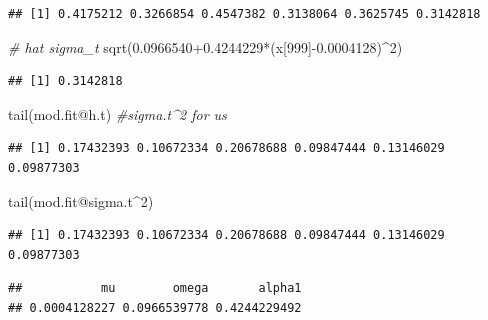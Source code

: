 \documentclass[
]{book}
\newenvironment{Shaded}{\begin{snugshade}}{\end{snugshade}}
\newcommand{\CommentTok}[1]{\textcolor[rgb]{0.56,0.35,0.01}{\textit{#1}}}
\newcommand{\DecValTok}[1]{\textcolor[rgb]{0.00,0.00,0.81}{#1}}
\newcommand{\FloatTok}[1]{\textcolor[rgb]{0.00,0.00,0.81}{#1}}
\newcommand{\FunctionTok}[1]{\textcolor[rgb]{0.00,0.00,0.00}{#1}}
\newcommand{\NormalTok}[1]{#1}
\newcommand{\SpecialCharTok}[1]{\textcolor[rgb]{0.00,0.00,0.00}{#1}}
\theoremstyle{definition}
\theoremstyle{definition}
\theoremstyle{definition}
\theoremstyle{definition}
\theoremstyle{remark}
\begin{document}
\begin{verbatim}
## [1] 0.4175212 0.3266854 0.4547382 0.3138064 0.3625745 0.3142818
\end{verbatim}

\begin{Shaded}
\begin{Highlighting}[]
\CommentTok{\# hat sigma\_t}
\FunctionTok{sqrt}\NormalTok{(}\FloatTok{0.0966540+0.4244229}\SpecialCharTok{*}\NormalTok{(x[}\DecValTok{999}\NormalTok{]}\SpecialCharTok{{-}}\FloatTok{0.0004128}\NormalTok{)}\SpecialCharTok{\^{}}\DecValTok{2}\NormalTok{)}
\end{Highlighting}
\end{Shaded}

\begin{verbatim}
## [1] 0.3142818
\end{verbatim}

\begin{Shaded}
\begin{Highlighting}[]
\FunctionTok{tail}\NormalTok{(mod.fit}\SpecialCharTok{@}\NormalTok{h.t)  }\CommentTok{\#sigma.t\^{}2 for us}
\end{Highlighting}
\end{Shaded}

\begin{verbatim}
## [1] 0.17432393 0.10672334 0.20678688 0.09847444 0.13146029 0.09877303
\end{verbatim}

\begin{Shaded}
\begin{Highlighting}[]
\FunctionTok{tail}\NormalTok{(mod.fit}\SpecialCharTok{@}\NormalTok{sigma.t}\SpecialCharTok{\^{}}\DecValTok{2}\NormalTok{)}
\end{Highlighting}
\end{Shaded}

\begin{verbatim}
## [1] 0.17432393 0.10672334 0.20678688 0.09847444 0.13146029 0.09877303
\end{verbatim}

\begin{Shaded}
\end{Shaded}

\begin{verbatim}
##           mu        omega       alpha1 
## 0.0004128227 0.0966539778 0.4244229492
\end{verbatim}
\end{document}
